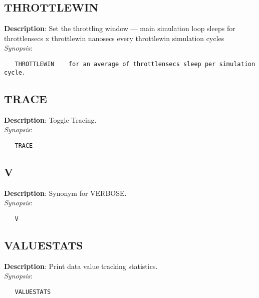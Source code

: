 \subsection{\bf THROTTLEWIN}
\label{manpages:THROTTLEWIN}
\label{manpages:throttlewin}
\vspace{-0.2in}
{\bf Description}: 	Set the throttling window --- main simulation loop sleeps for throttlensecs x throttlewin nanosecs every throttlewin simulation cycles\\[1.5ex]
{\em Synopsis}:
\vspace{-0.2in}
\scriptsize
\begin{verbatim}
   THROTTLEWIN    for an average of throttlensecs sleep per simulation cycle.
\end{verbatim}
\normalsize
\vspace{-0.2in}


\subsection{\bf TRACE}
\label{manpages:TRACE}
\label{manpages:trace}
\vspace{-0.2in}
{\bf Description}: 	Toggle Tracing.\\[1.5ex]
{\em Synopsis}:
\vspace{-0.2in}
\scriptsize
\begin{verbatim}
   TRACE   							
\end{verbatim}
\normalsize
\vspace{-0.2in}


\subsection{\bf V}
\label{manpages:V}
\label{manpages:v}
\vspace{-0.2in}
{\bf Description}: 	Synonym for VERBOSE.\\[1.5ex]
{\em Synopsis}:
\vspace{-0.2in}
\scriptsize
\begin{verbatim}
   V   						
\end{verbatim}
\normalsize
\vspace{-0.2in}


\subsection{\bf VALUESTATS}
\label{manpages:VALUESTATS}
\label{manpages:valuestats}
\vspace{-0.2in}
{\bf Description}: 	Print data value tracking statistics.\\[1.5ex]
{\em Synopsis}:
\vspace{-0.2in}
\scriptsize
\begin{verbatim}
   VALUESTATS   
\end{verbatim}
\normalsize
\vspace{-0.2in}


